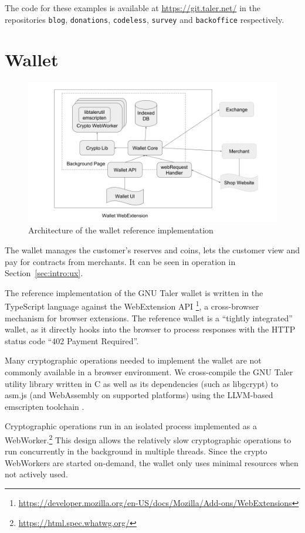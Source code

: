 The code for these examples is available at \url{https://git.taler.net/} in the
repositories \texttt{blog}, \texttt{donations}, \texttt{codeless}, \texttt{survey}
and \texttt{backoffice} respectively.

\section{Wallet}
\begin{figure}
    \includegraphics[width=\textwidth]{diagrams/taler-diagram-wallet.png}
    \caption{Architecture of the wallet reference implementation}
\end{figure}

The wallet manages the customer's reserves and coins, lets the customer view
and pay for contracts from merchants.  It can be seen in operation in
Section~\ref{sec:intro:ux}.

The reference implementation of the GNU Taler wallet is written in the
TypeScript language against the WebExtension API%
\footnote{\url{https://developer.mozilla.org/en-US/docs/Mozilla/Add-ons/WebExtensions}}, a cross-browser mechanism for
browser extensions.  The reference wallet is a ``tightly integrated'' wallet, as it directly hooks into
the browser to process responses with the HTTP status code ``402 Payment Required''.

Many cryptographic operations needed to implement the wallet are not commonly
available in a browser environment.  We cross-compile the GNU Taler utility
library written in C as well as its dependencies (such as libgcrypt) to asm.js
(and WebAssembly on supported platforms) using the LLVM-based emscripten
toolchain \cite{zakai2011emscripten}.

Cryptographic operations run in an isolated process implemented as a
WebWorker.\footnote{\url{https://html.spec.whatwg.org/}}  This design allows
the relatively slow cryptographic operations to run concurrently in the
background in multiple threads.  Since the crypto WebWorkers are started on-demand,
the wallet only uses minimal resources when not actively used.

